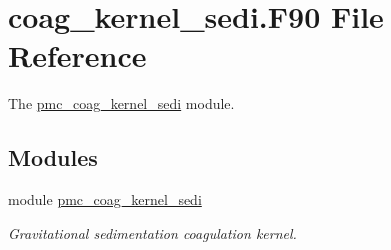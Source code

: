 \hypertarget{coag__kernel__sedi_8_f90}{}\section{coag\+\_\+kernel\+\_\+sedi.\+F90 File Reference}
\label{coag__kernel__sedi_8_f90}


The \mbox{\hyperlink{namespacepmc__coag__kernel__sedi}{pmc\+\_\+coag\+\_\+kernel\+\_\+sedi}} module.  


\subsection*{Modules}
\begin{DoxyCompactItemize}
\item 
module \mbox{\hyperlink{namespacepmc__coag__kernel__sedi}{pmc\+\_\+coag\+\_\+kernel\+\_\+sedi}}
\begin{DoxyCompactList}\small\item\em Gravitational sedimentation coagulation kernel. \end{DoxyCompactList}\end{DoxyCompactItemize}
